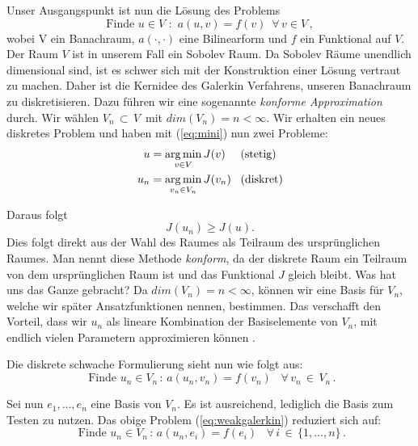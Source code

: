 Unser Ausgangspunkt ist nun die Lösung des Problems
\begin{equation} \label{eq:cont}
\text{Finde } u \in V \text{ : } \, a(u,v) = f(v) \, \, \, \forall \, v \in V \, ,
\end{equation}
wobei V ein Banachraum, $a(\cdot,\cdot)$ eine Bilinearform und $f$ ein Funktional auf $V$. Der Raum $V$ ist in unserem Fall ein Sobolev Raum.
Da Sobolev Räume unendlich dimensional sind, ist es schwer sich mit der Konstruktion einer Lösung vertraut zu machen. Daher ist die Kernidee des Galerkin Verfahrens, unseren Banachraum zu diskretisieren. 
Dazu führen wir eine sogenannte \textit{konforme Approximation} durch.
Wir wählen $V_{n} \, \subset \,V \, $ mit $dim(V_{n}) = n < \infty $. Wir erhalten ein neues diskretes Problem und haben mit (\ref{eq:mini}) nun zwei Probleme:
\begin{equation*}
\begin{aligned}
u &= \operatorname*{arg\,min}_{v \in V} J(v)  \, \, \, \, \, \, \text{ (stetig)}\\
u_n &= \operatorname*{arg\,min}_{v_n \in V_n} J(v_n) \, \, \, \text{ (diskret)}
\end{aligned}
\end{equation*}

Daraus folgt
\begin{equation*}
J(u_n) \geq J(u).
\end{equation*}
Dies folgt direkt aus der Wahl des Raumes als Teilraum des ursprünglichen Raumes. Man nennt diese Methode \textit{konform}, da der diskrete Raum ein Teilraum von dem ursprünglichen Raum ist und das Funktional $J$ gleich bleibt. 
Was hat uns das Ganze gebracht? Da $dim(V_n) = n < \infty$, können wir eine Basis für $V_n$, welche wir später Ansatzfunktionen nennen, bestimmen. Das verschafft den Vorteil, dass wir $u_n$ als lineare Kombination der Basiselemente von $V_n$, mit endlich vielen Parametern approximieren können . 

Die diskrete schwache Formulierung sieht nun wie folgt aus:
\begin{equation}
\text{ Finde } u_n \in V_n  \, :  \, a(u_n,v_n)=f(v_n)  \, \, \,  \, \, \forall \, v_n \, \in \, V_n \, . \label{eq:weakgalerkin} 
\end{equation}

Sei nun $e_1, \dots , e_n$ eine Basis von $V_n$. Es ist ausreichend, lediglich die Basis zum Testen zu nutzen.
Das obige Problem (\ref{eq:weakgalerkin}) reduziert sich auf:
\begin{equation} \label{eq:weak1}
\text{ Finde } u_n \in V_n  \, :  \, a(u_n,e_i)=f(e_i)  \, \, \,  \, \, \forall \, i \, \in \, \{1,\dots,n\} \, .
\end{equation}


